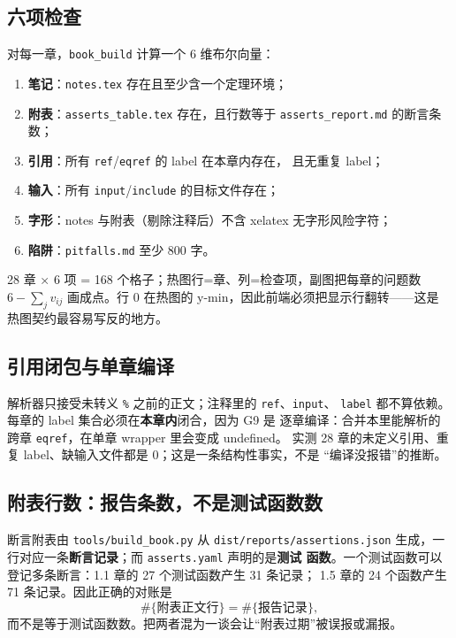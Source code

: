 \subsection{六项检查}

对每一章，\texttt{book\_build} 计算一个 6 维布尔向量：
\begin{enumerate}
  \item \textbf{笔记}：\texttt{notes.tex} 存在且至少含一个定理环境；
  \item \textbf{附表}：\texttt{asserts\_table.tex} 存在，且行数等于
        \texttt{asserts\_report.md} 的断言条数；
  \item \textbf{引用}：所有 \texttt{ref}/\texttt{eqref} 的 label 在本章内存在，
        且无重复 label；
  \item \textbf{输入}：所有 \texttt{input}/\texttt{include} 的目标文件存在；
  \item \textbf{字形}：notes 与附表（剔除注释后）不含 xelatex 无字形风险字符；
  \item \textbf{陷阱}：\texttt{pitfalls.md} 至少 800 字。
\end{enumerate}
28 章 × 6 项 = 168 个格子；热图行=章、列=检查项，副图把每章的问题数
$6-\sum_j v_{ij}$ 画成点。行 0 在热图的 y-min，因此前端必须把显示行翻转——这是
热图契约最容易写反的地方。

\subsection{引用闭包与单章编译}

解析器只接受未转义 \texttt{\%} 之前的正文；注释里的 \texttt{ref}、\texttt{input}、
\texttt{label} 都不算依赖。每章的 label 集合必须在\textbf{本章内}闭合，因为 G9 是
逐章编译：合并本里能解析的跨章 \texttt{eqref}，在单章 wrapper 里会变成 undefined。
实测 28 章的未定义引用、重复 label、缺输入文件都是 0；这是一条结构性事实，不是
“编译没报错”的推断。

\subsection{附表行数：报告条数，不是测试函数数}

断言附表由 \texttt{tools/build\_book.py} 从 \texttt{dist/reports/assertions.json}
生成，一行对应一条\textbf{断言记录}；而 \texttt{asserts.yaml} 声明的是\textbf{测试
函数}。一个测试函数可以登记多条断言：1.1 章的 27 个测试函数产生 31 条记录；
1.5 章的 24 个函数产生 71 条记录。因此正确的对账是
\[
  \#\{\text{附表正文行}\}=\#\{\text{报告记录}\},
\]
而不是等于测试函数数。把两者混为一谈会让“附表过期”被误报或漏报。

